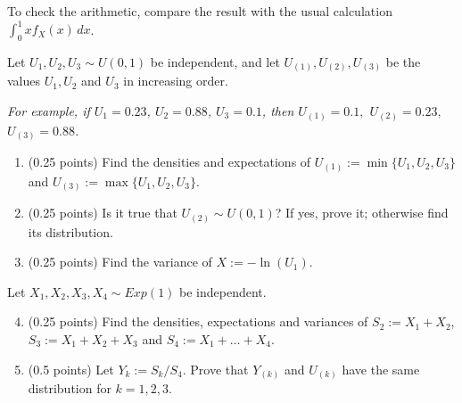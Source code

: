 \documentclass[a4paper]{report}
\begin{document}
\begin{solution}
\begin{enumerate}
        To check the arithmetic, compare the result with the usual calculation $\int_0^1xf_X(x)\,dx$.

    \end{enumerate}
\end{solution}

\begin{problem}
    Let $U_1,U_2,U_3\sim U(0,1)$ be independent, and let $U_{(1)},U_{(2)},U_{(3)}$
    be the values $U_1,U_2$
    and $U_3$ in increasing order.

\textit{For example, if $U_1=0.23$, $U_2=0.88$, $U_3=0.1$, then
$U_{(1)}=0.1,$ $ U_{(2)}=0.23,$ $ U_{(3)}=0.88$. }
    \begin{enumerate}
        \item (0.25 points) Find the densities and expectations of $U_{(1)}:=\min\{U_1,U_2,U_3\}$ and $U_{(3)}:=
        \max\{U_1, U_2, U_3\}$.
        \item (0.25 points) Is it true that
        $U_{(2)}\sim U(0,1)$? If yes, prove it;
        otherwise find its distribution.
        \item (0.25 points) Find the variance
        of $X:=-\ln(U_1)$.
    \end{enumerate}
    Let $X_1,X_2,X_3,X_4\sim Exp(1)$
    be independent.
    \begin{enumerate}
         \setcounter{enumi}{3}
        \item (0.25 points) Find the densities,
        expectations and variances of
        $S_2:=X_1+X_2$, $S_3:=X_1+X_2+X_3$ and $S_4:=X_1+\dots+X_4$.
        \item (0.5 points) Let $Y_k:={S_k}/{
        S_4}$. Prove that $Y_{(k)}$ and $U_{(k)
}$ have the same distribution for $k=1,2,3$.

    \end{enumerate}
\end{problem}
\end{document}
